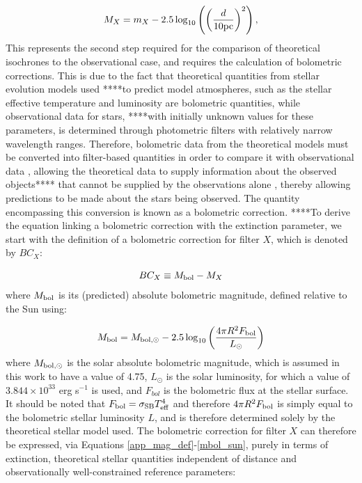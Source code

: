 \documentclass[12pt, a4paper]{report}
\begin{document}
\begin{equation}
M_{X} = m_{X} - 2.5 \log_{10}\left( \left( \frac{d}{10 \textnormal{pc}} \right)^{2} \right),
\label{abs_mag_def}
\end{equation}
This represents the second step required for the comparison of theoretical isochrones to the observational case, and requires the calculation of bolometric corrections. This is due to the fact that theoretical quantities from stellar evolution models used ****to predict model atmospheres, such as the stellar effective temperature and luminosity are bolometric quantities, while observational data for stars, ****with initially unknown values for these parameters, is determined through photometric filters with relatively narrow wavelength ranges. Therefore, bolometric data from the theoretical models must be converted into filter-based quantities in order to compare it with observational data \citep{1996ApJ...469..355F}, allowing the theoretical data to supply information about the observed objects**** that cannot be supplied by the observations alone \citep{2002A&A...391..195G}, thereby allowing predictions to be made about the stars being observed. The quantity encompassing this conversion is known as a bolometric correction. ****To derive the equation linking a bolometric correction with the extinction parameter, we start with the definition of a bolometric correction for filter $X$, which is denoted by $BC_{X}$:

\begin{equation}
BC_{X} \equiv M_{\textnormal{bol}} - M_{X}
\label{BC_def}
\end{equation}
where $M_{\textnormal{bol}}$ is its (predicted) absolute bolometric magnitude, defined relative to the Sun using:

\begin{equation}
M_{\textnormal{bol}} = M_{\textnormal{bol},\odot} - 2.5 \log_{10} \left( \frac{4\pi R^{2}F_{\textnormal{bol}}}{L_{\odot}} \right)
\label{mbol_sun}
\end{equation}
where $M_{\textnormal{bol},\odot}$ is the solar absolute bolometric magnitude, which is assumed in this work to have a value of 4.75, $L_{\odot}$ is the solar luminosity, for which a value of $3.844 \times 10^{33}$ erg s$^{-1}$ is used, and $F_{bol}$ is the bolometric flux at the stellar surface. It should be noted that $F_{\textnormal{bol}} = \sigma_{\textnormal{SB}} T_{\textnormal{eff}}^{4}$ and therefore $4\pi R^{2}F_{\textnormal{bol}}$ is simply equal to the bolometric stellar luminosity $L$, and is therefore determined solely by the theoretical stellar model used. The bolometric correction for filter $X$ can therefore be expressed, via Equations \ref{app_mag_def}-\ref{mbol_sun}, purely in terms of extinction, theoretical stellar quantities independent of distance and observationally well-constrained reference parameters:
\end{document}
